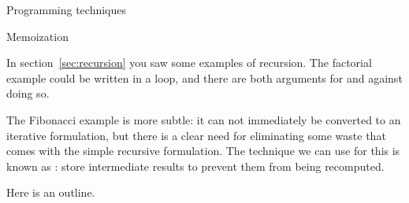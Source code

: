  {Programming techniques}

 {Memoization}
\label{sec:memo}

In section~\ref{sec:recursion} you saw some examples of recursion. The
factorial example could be written in a loop, and there are both arguments
for and against doing so. 

The Fibonacci example is more subtle: it can not immediately be
converted to an iterative formulation, but there is a clear need for
eliminating some waste that comes with the simple recursive
formulation. The technique we can use for this is known as
: store intermediate results to prevent them
from being recomputed.

Here is an outline.
